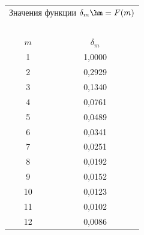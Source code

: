   


  \begin{figure}


  \begin{minipage}[c]{60mm}


  {\small


  \begin{center}


    \begin{tabular}{|c|c|}


  \multicolumn{2}{p{35mm}}{Значения функции $\delta_m\hm=F(m)$}\\


  \multicolumn{2}{c}{\ }\\[-6pt] 


    \hline


$m$&$\delta_m$\\


\hline


1&1,0000\\


2&0,2929\\


3&0,1340\\


4&0,0761\\


5&0,0489\\


6&0,0341\\


7&0,0251\\


8&0,0192\\


9&0,0152\\


10\hphantom{9}&0,0123\\


11\hphantom{9}&0,0102\\


12\hphantom{9}&0,0086\\


\hline


\end{tabular}


\end{center}}


\end{minipage}


\hfill





\end{figure}
